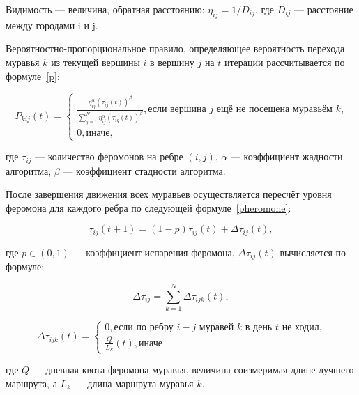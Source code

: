 Видимость --- величина, обратная расстоянию: $\eta_{ij} = 1/D_{ij}$, где $D_{ij}$ --- расстояние между городами i и j.

Вероятностно-пропорциональное правило, определяющее вероятность перехода муравья $k$ из текущей вершины $i$ в вершину $j$ на $t$ итерации рассчитывается по формуле~\eqref{p}:

\begin{equation}
    \label{p}
    P_{kij}(t) = 
    \begin{cases}
        \frac{\eta_{ij}^\alpha (\tau_{ij}(t))^\beta}{\sum_{q=1}^N \eta_{ij}^\alpha (\tau_{iq}(t))^\beta}, \text{если вершина $j$ ещё не посещена муравьём $k$,} \\
        0, \text{иначе,}
    \end{cases}
\end{equation}

где $\tau_{ij}$ --- количество феромонов на ребре $(i, j)$, $\alpha$ --- коэффициент жадности алгоритма, $\beta$ --- коэффициент стадности алгоритма.

После завершения движения всех муравьев осуществляется пересчёт уровня феромона для каждого ребра по следующей формуле~\eqref{pheromone}:

\begin{equation}
    \label{pheromone}
    \tau_{ij}(t+1) = (1-p)\tau_{ij}(t) + \Delta\tau_{ij}(t),
\end{equation}

где $p \in (0, 1)$ — коэффициент испарения феромона, $\Delta\tau_{ij}(t)$ вычисляется по формуле:

\begin{equation}
    \label{delta_tau}
    \Delta\tau_{ij} = \sum_{k=1}^N \Delta\tau_{ijk}(t),
\end{equation}

\begin{equation}
    \label{delta_tau_k}
    \Delta\tau_{ijk}(t) = 
    \begin{cases}
        0, \text{если по ребру $i-j$ муравей $k$ в день $t$ не ходил,}\\
        \frac{Q}{L_{k}}(t), \text{иначе}
    \end{cases}
\end{equation}

где $Q$ --- дневная квота феромона муравья, величина соизмеримая длине лучшего маршрута, а $L_k$ --- длина маршрута муравья $k$.

